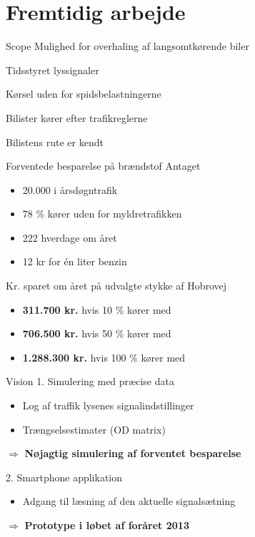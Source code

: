 \section{Fremtidig arbejde}
\begin{frame}{Scope}
Mulighed for overhaling af langsomtkørende biler
\vspace{4mm}

Tidsstyret lyssignaler
\vspace{4mm}

Kørsel uden for spidsbelastningerne
\vspace{4mm}

Bilister kører efter trafikreglerne

\vspace{4mm}
Bilistens rute er kendt

\end{frame}

\begin{frame}{Forventede besparelse på brændstof}%
Antaget
\begin{itemize}
\item 20.000 i årsdøgntrafik
\item 78 \% kører uden for myldretrafikken
\item 222 hverdage om året
\item 12 kr for én liter benzin
\end{itemize}
\vspace{5mm}
Kr. sparet om året på udvalgte stykke af Hobrovej
\begin{itemize}
\item \textbf{311.700 kr.} hvis 10 \% kører med \tech
\item \textbf{706.500 kr.} hvis 50 \% kører med \tech
\item \textbf{1.288.300 kr.} hvis 100 \% kører med \tech
\end{itemize}

\end{frame}


\begin{frame}{Vision}
1. Simulering med præcise data
	\begin{itemize}
	\item Log af traffik lysenes signalindstillinger
	\item Trængselsestimater (OD matrix)
	\end{itemize}
	\hspace{4mm}$\Longrightarrow$ \textbf{Nøjagtig simulering af forventet besparelse}
\vspace{5mm}

2. Smartphone applikation
	\begin{itemize}
	\item Adgang til læsning af den aktuelle signalsætning
	\end{itemize}
	\hspace{4mm}$\Longrightarrow$ \textbf{Prototype i løbet af foråret 2013}
\end{frame}

